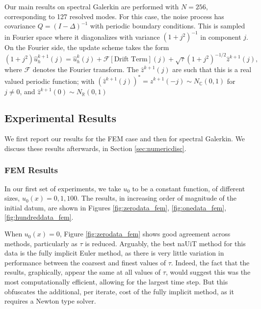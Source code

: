 \documentclass[reqno, 11pt]{amsart}
\theoremstyle{plain}
\theoremstyle{definition}
\theoremstyle{remark}
\numberwithin{equation}{section}
\numberwithin{theorem}{section}
\begin{document}
{Our main results on spectral Galerkin are performed with $N = 256$, corresponding to 127 resolved modes.   For this case, the noise process has covariance $Q = (I - \Delta)^{-1}$ with periodic boundary conditions.  This is sampled in Fourier space where it diagonalizes with variance $(1 + j^2)^{-1}$ in component $j$.  On the Fourier side, the update scheme takes the form
\begin{equation*}
(1+j^2)\hat{u}^{k+1}_{h}(j) = \hat{u}^{k}_{h}(j)  + \mathcal{F}[\text{Drift Term}](j) + \sqrt{\tau} (1+j^2)^{-1/2} \hat{z}^{k+1}(j),
\end{equation*}
where  $\mathcal{F}$ denotes the Fourier transform.  The $\hat{z}^{k+1}(j)$ are such that this is a real valued periodic function; with $(\hat{z}^{k+1}(j))^\ast = \hat{z}^{k+1}(-j)\sim N_{\mathbb{C}}(0,1)$  for $j \neq 0$, and $\hat{z}^{k+1}(0)\sim N_{\mathbb{R}}(0,1)$



\subsection{Experimental Results}

We first report our results for the FEM case and then for spectral Galerkin.  We discuss these results afterwards, in Section \ref{sec:numericdisc}.

\subsubsection{FEM Results}
In our first set of experiments, we take $u_0$ to be a constant function, of different sizes, $u_0(x) = 0, 1, 100$.   The results, in increasing order of magnitude of the initial datum,  are shown in Figures \ref{fig:zerodata_fem}, \ref{fig:onedata_fem}, \ref{fig:hundreddata_fem}. 

When $u_0(x) = 0$, Figure \ref{fig:zerodata_fem} shows good agreement across methods, particularly as $\tau$ is reduced.  Arguably, the best naUiT method for this data is the fully implicit Euler method, as there is very little variation in performance between the coarsest and finest values of $\tau$.  Indeed, the fact  that the results, graphically, appear the same at all values of $\tau$, would suggest this was the most computationally efficient, allowing for the largest time step.  But this obfuscates the additional, per iterate, cost of the fully implicit method, as it requires a Newton type solver.  

}
\end{document}
